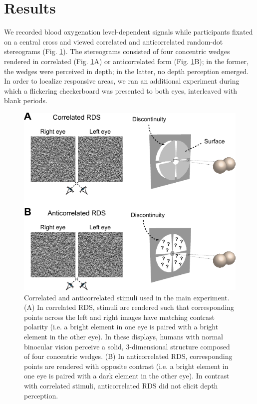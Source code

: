 \section{Results}
We recorded blood oxygenation level-dependent signals while participants fixated on a central cross and viewed correlated and anticorrelated random-dot stereograms (Fig. \ref{fig:ch5fig1}). The stereograms consisted of four concentric wedges rendered in correlated (Fig. \ref{fig:ch5fig1}A) or anticorrelated form (Fig. \ref{fig:ch5fig1}B); in the former, the wedges were perceived in depth; in the latter, no depth perception emerged. In order to localize responsive areas, we ran an additional experiment during which a flickering checkerboard was presented to both eyes, interleaved with blank periods.

\begin{figure}
  \centering
  \includegraphics[keepaspectratio]{Fig1.pdf}
  \caption[Correlated and anticorrelated RDS stimuli.]{Correlated and anticorrelated stimuli used in the main experiment. (A) In correlated RDS, stimuli are rendered such that corresponding points across the left and right images have matching contrast polarity (i.e. a bright element in one eye is paired with a bright element in the other eye). In these displays, humans with normal binocular vision perceive a solid, 3-dimensional structure composed of four concentric wedges. (B) In anticorrelated RDS, corresponding points are rendered with opposite contrast (i.e. a bright element in one eye is paired with a dark element in the other eye). In contrast with correlated stimuli, anticorrelated RDS did not elicit depth perception.}
  \label{fig:ch5fig1}
\end{figure}

